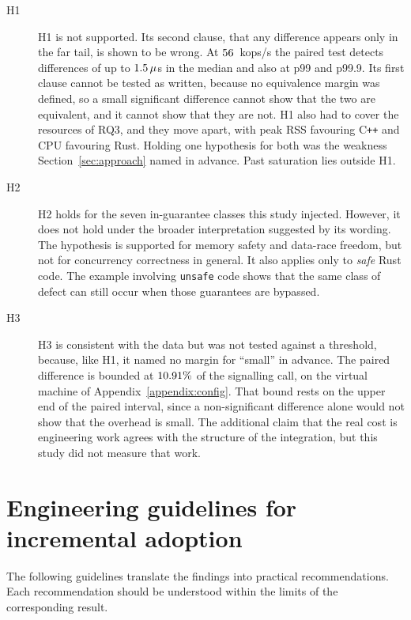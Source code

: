 \documentclass[english,oneside,a4paper,censored,csm,software-track-2020]{HYthesisML}
\begin{document}
\begin{description}
  \item[H1] H1 is not supported. Its second clause, that any difference
        appears only in the far tail, is shown to be wrong. At $56$~kops/s the
        paired test detects differences of up to $1.5\,\mu$s in
        the median and also at p99 and p99.9. Its first clause cannot be tested
        as written, because no equivalence margin was defined, so a small
        significant difference cannot show that the two are equivalent, and it
        cannot show that they are not. H1
        also had to cover the resources of RQ3, and they move apart, with peak
        RSS favouring C\texttt{++} and CPU favouring Rust. Holding one hypothesis for
        both was the weakness Section~\ref{sec:approach} named in advance.
        Past saturation lies outside H1.
  \item[H2] H2 holds for the seven in-guarantee classes this study injected.
        However, it does not hold under the broader interpretation suggested by
        its wording. The hypothesis is supported for memory safety and
        data-race freedom, but not for concurrency correctness in general. It
        also applies only to \emph{safe} Rust code. The example involving
        \texttt{unsafe} code shows that the same class of defect can still
        occur when those guarantees are bypassed.
  \item[H3] H3 is consistent with the data but was not tested against a
        threshold, because, like H1, it named no margin for ``small'' in
        advance. The paired difference is bounded at $10.91\%$ of the
        signalling call, on the virtual machine of Appendix~\ref{appendix:config}.
        That bound rests on the upper end of the paired interval, since a
        non-significant difference alone would not show that the overhead is
        small. The additional claim that the real cost is engineering work agrees
        with the structure of the integration, but this study did not measure that
        work.
\end{description}

\section{Engineering guidelines for incremental adoption}\label{sec:guidelines}
The following guidelines translate the findings into practical
recommendations. Each recommendation should be understood within the limits of
the corresponding result.
\end{document}

